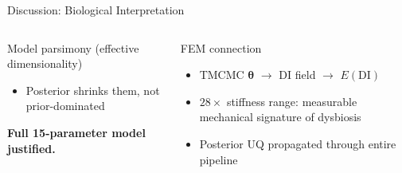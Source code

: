 \documentclass[aspectratio=169,10pt,t]{beamer}
\newcommand{\btheta}{\boldsymbol{\theta}}
\newcommand{\hl}[1]{\textbf{\textcolor{ikm}{#1}}}
\begin{document}
\begin{frame}[t]{Discussion: Biological Interpretation}
\begin{columns}[T]
\begin{block}{Model parsimony (effective dimensionality)}
\begin{itemize}
          \item[$\Rightarrow$] Posterior shrinks them, not prior-dominated
        \end{itemize}
        \vspace{3pt}
        \hl{Full 15-parameter model justified.}
      \end{block}
      \vspace{5pt}
      \begin{exampleblock}{FEM connection}
        \begin{itemize}\setlength{\itemsep}{1pt}
          \item TMCMC $\btheta$ $\to$ DI field $\to$ $E(\mathrm{DI})$
          \item $28\times$ stiffness range: measurable mechanical signature of dysbiosis
          \item Posterior UQ propagated through entire pipeline
        \end{itemize}
      \end{exampleblock}
  \end{columns}
\end{frame}
\end{document}

